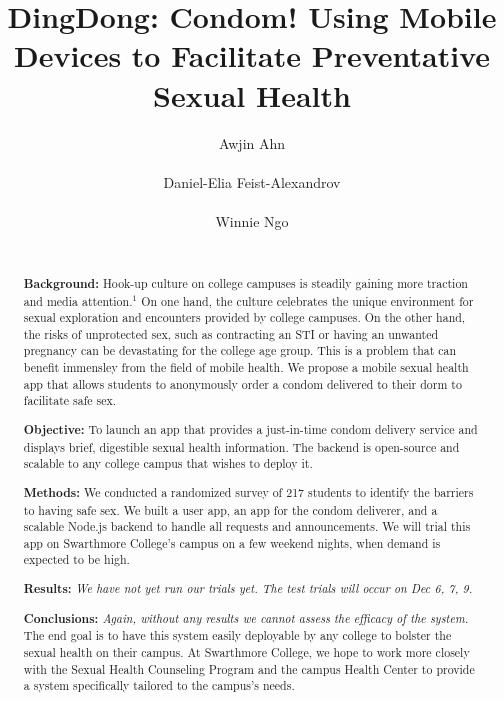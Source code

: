 \documentclass{acm_proc_article-sp}
\begin{document}
\title{DingDong: Condom! Using Mobile Devices to Facilitate Preventative Sexual Health}
\author{
\alignauthor
Awjin Ahn\\
  \vspace{0.567cm}
  \\
\alignauthor
Daniel-Elia Feist-Alexandrov\\
  \vspace{0.2cm}
  \\
\alignauthor
Winnie Ngo\\
  \vspace{0.567cm}
  \\
}
\maketitle


\begin{abstract}
\smallskip
\textbf{Background:} Hook-up culture on college campuses is steadily gaining more traction and media attention.$^1$ On one hand, the culture celebrates the unique environment for sexual exploration and encounters provided by college campuses. On the other hand, the risks of unprotected sex, such as contracting an STI or having an unwanted pregnancy can be devastating for the college age group. This is a problem that can benefit immensley from the field of mobile health. We propose a mobile sexual health app that allows students to anonymously order a condom delivered to their dorm to facilitate safe sex.

\textbf{Objective:} To launch an app that provides a just-in-time condom delivery service and displays brief, digestible sexual health information. The backend is open-source and scalable to any college campus that wishes to deploy it.

\textbf{Methods:} We conducted a randomized survey of 217 students to identify the barriers to having safe sex. We built a user app, an app for the condom deliverer, and a scalable Node.js backend to handle all requests and announcements. We will trial this app on Swarthmore College's campus on a few weekend nights, when demand is expected to be high.

\textbf{Results:} \textit{We have not yet run our trials yet. The test trials will occur on Dec 6, 7, 9.}

\textbf{Conclusions:} \textit{Again, without any results we cannot assess the efficacy of the system.} The end goal is to have this system easily deployable by any college to bolster the sexual health on their campus. At Swarthmore College, we hope to work more closely with the Sexual Health Counseling Program and the campus Health Center to provide a system specifically tailored to the campus's needs.
\end{abstract}
\end{document}
